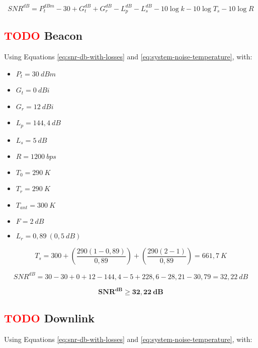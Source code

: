 \begin{equation} \label{eq:snr-db-with-losses}
    SNR^{dB} = P_{t}^{dBm} - 30 + G_{t}^{dB} + G_{r}^{dB} - L_{p}^{dB} - L_{s}^{dB} - 10\log k - 10\log T_{s} - 10\log R
\end{equation}

\subsection{ \textcolor{red}{TODO} Beacon}

Using Equations \ref{eq:snr-db-with-losses} and \ref{eq:system-noise-temperature}, with:

\begin{itemize}
    \item $P_{t} = 30\ dBm$
    \item $G_{t} = 0\ dBi$
    \item $G_{r} = 12\ dBi$
    \item $L_{p} = 144,4\ dB$
    \item $L_{s} = 5\ dB$
    \item $R = 1200\ bps$
    \item $T_{0} = 290\ K$
    \item $T_{r} = 290\ K$
    \item $T_{ant} = 300\ K$
    \item $F = 2\ dB$
    \item $L_{r} = 0,89\ (0,5\ dB)$
\end{itemize}

\begin{equation}
    T_{s} = 300 + \left( \frac{290 (1 - 0,89)}{0,89} \right) + \left( \frac{290 (2 - 1)}{0,89} \right) = 661,7\ K
\end{equation}

\begin{equation}
    SNR^{dB} = 30 - 30 + 0 + 12 - 144,4 - 5 + 228,6 - 28,21 - 30,79 = 32,22\ dB
\end{equation}

\begin{equation}
\mathbf{SNR^{dB} \geq 32,22\ dB}
\end{equation}

\subsection{ \textcolor{red}{TODO} Downlink}

Using Equations \ref{eq:snr-db-with-losses} and \ref{eq:system-noise-temperature}, with:

